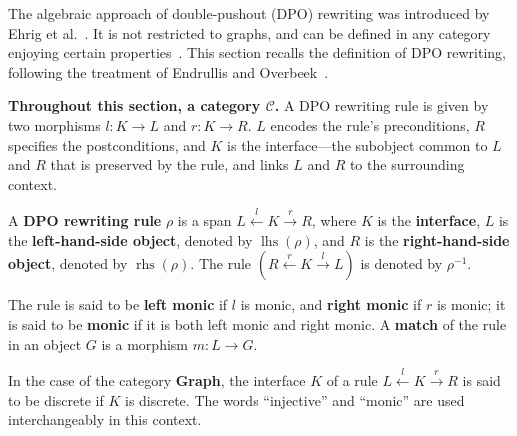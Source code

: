 The algebraic approach of double-pushout (DPO) rewriting was introduced by Ehrig et al.~\cite{ehrig1973graph}. It is not restricted to graphs, and can be defined in any category enjoying certain properties~\cite{ehrig2006fundamentals,lack2004adhesive}. This section recalls the definition of DPO rewriting, following the treatment of Endrullis and Overbeek~\cite{endrullis2024generalized_icgt}.

\textbf{Throughout this section, a category \( \mathcal{C} \).}
 A DPO rewriting rule is given by two morphisms \(l: K \mathop{\to} L\) and \(r: K \mathop{\to} R\). \(L\) encodes the rule's preconditions, \(R\) specifies the postconditions, and \(K\) is the interface—the subobject common to \(L\) and \(R\) that is preserved by the rule, and links \(L\) and \(R\) to the surrounding context.
\begin{definition} 
  \label{def:grs:dpo_rule}
A \textbf{DPO rewriting rule} $\rho$ is a span \( L \overset{l}{\leftarrow} K \overset{r}{\rightarrow} R \), where \( K \) is the \textbf{interface}, \( L \) is the \textbf{left-hand-side object}, denoted by \( \operatorname{lhs}(\rho) \), and \( R \) is the \textbf{right-hand-side object}, denoted by \( \operatorname{rhs}(\rho) \). The rule $(R \overset{r}{\leftarrow} K \overset{l}{\rightarrow} L)$ is denoted by $\rho^{-1}$. 

The rule is said to be \textbf{left monic} if \( l \) is monic, and \textbf{right monic} if \( r \) is monic; 
it is said to be \textbf{monic} if it is both left monic and right monic.
A \textbf{match} of the rule in an object \( G \) is a morphism \( m: L \mathop{\rightarrow} G \). 
\end{definition}
In the case of the category \textbf{Graph}, 
the interface $K$ of a rule \( L \overset{l}{\leftarrow} K \overset{r}{\rightarrow} R \) is said to be discrete if $K$ is discrete.
The words \enquote{injective} and \enquote{monic} are used interchangeably in this context.

